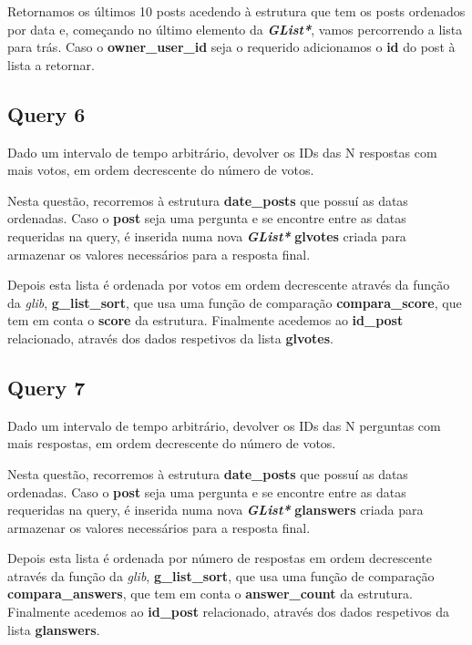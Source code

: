 \documentclass[a4paper]{article}
\begin{document}
Retornamos os últimos 10 posts acedendo à estrutura que tem os posts
ordenados por data e, começando no último elemento da \textit{
\textbf{GList*}}, vamos percorrendo a lista para trás. Caso o 
\textbf{owner\_user\_id} seja o requerido adicionamos o \textbf{id} 
do post à lista a retornar.

\subsection{Query 6}

Dado um intervalo de tempo arbitrário, devolver os IDs das N respostas 
com mais votos, em ordem decrescente do número de votos.

Nesta questão, recorremos à estrutura \textbf{date\_posts} que possuí 
as datas ordenadas. Caso o \textbf{post} seja uma pergunta e
se encontre entre as datas requeridas na query, é inserida numa nova
\textit{\textbf{GList*}} \textbf{glvotes} criada para armazenar os 
valores necessários para a resposta final.

Depois esta lista é ordenada por votos em ordem decrescente através da 
função da \textit{glib}, \textbf{g\_list\_sort}, que usa uma função de 
comparação \textbf{compara\_score}, que tem em conta o \textbf{score}
da estrutura. Finalmente acedemos ao \textbf{id\_post} relacionado, 
através dos dados respetivos da lista \textbf{glvotes}.

\subsection{Query 7}

Dado um intervalo de tempo arbitrário, devolver os IDs das N perguntas 
com mais respostas, em ordem decrescente do número de votos.

Nesta questão, recorremos à estrutura \textbf{date\_posts} que possuí 
as datas ordenadas. Caso o \textbf{post} seja uma pergunta e
se encontre entre as datas requeridas na query, é inserida numa nova
\textit{\textbf{GList*}} \textbf{glanswers} criada para armazenar os 
valores necessários para a resposta final.

Depois esta lista é ordenada por número de respostas em ordem decrescente 
através da função da \textit{glib}, \textbf{g\_list\_sort}, que usa uma 
função de comparação \textbf{compara\_answers}, que tem em conta o 
\textbf{answer\_count} da estrutura. Finalmente acedemos ao 
\textbf{id\_post} relacionado, através dos dados respetivos da lista 
\textbf{glanswers}.
\end{document}
